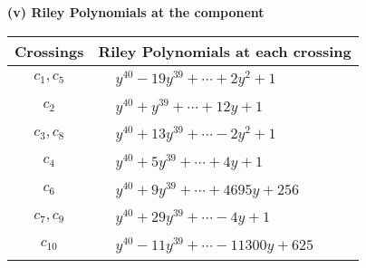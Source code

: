 \documentclass[1p]{elsarticle_modified}
\theoremstyle{definition}
\begin{document}
\newpage\renewcommand{\arraystretch}{1}
\flushleft \textbf{(v) Riley Polynomials at the component}\newline \\
\begin{tabular}{m{50pt}|m{274pt}}
Crossings & \hspace{64pt}Riley Polynomials at each crossing \\
\hline $$\begin{aligned}c_{1},c_{5}\end{aligned}$$&$\begin{aligned}
&y^{40}-19 y^{39}+\cdots+2 y^2+1
\end{aligned}$\\
\hline $$\begin{aligned}c_{2}\end{aligned}$$&$\begin{aligned}
&y^{40}+y^{39}+\cdots+12 y+1
\end{aligned}$\\
\hline $$\begin{aligned}c_{3},c_{8}\end{aligned}$$&$\begin{aligned}
&y^{40}+13 y^{39}+\cdots-2 y^2+1
\end{aligned}$\\
\hline $$\begin{aligned}c_{4}\end{aligned}$$&$\begin{aligned}
&y^{40}+5 y^{39}+\cdots+4 y+1
\end{aligned}$\\
\hline $$\begin{aligned}c_{6}\end{aligned}$$&$\begin{aligned}
&y^{40}+9 y^{39}+\cdots+4695 y+256
\end{aligned}$\\
\hline $$\begin{aligned}c_{7},c_{9}\end{aligned}$$&$\begin{aligned}
&y^{40}+29 y^{39}+\cdots-4 y+1
\end{aligned}$\\
\hline $$\begin{aligned}c_{10}\end{aligned}$$&$\begin{aligned}
&y^{40}-11 y^{39}+\cdots-11300 y+625
\end{aligned}$\\
\hline
\end{tabular}\\~\\
\end{document}
